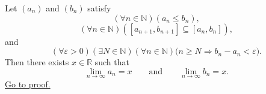 \begin{corollary}
\label{cor:nested-intervals-vanishing-length-have-equal-endpoint-limits}
Let $(a_n)$ and $(b_n)$ satisfy
\[
  (\forall n\in\mathbb{N})(a_n\leq b_n),
\]
\[
  (\forall n\in\mathbb{N})([a_{n+1},b_{n+1}]\subseteq [a_n,b_n]),
\]
and
\[
  (\forall\varepsilon>0)(\exists N\in\mathbb{N})(\forall n\in\mathbb{N})
  \bigl(n\geq N\Longrightarrow b_n-a_n<\varepsilon\bigr).
\]
Then there exists $x\in\mathbb{R}$ such that
\[
  \lim_{n\longrightarrow\infty}a_n=x
  \qquad\text{and}\qquad
  \lim_{n\longrightarrow\infty}b_n=x.
\]
\hyperref[prf:nested-intervals-vanishing-length-have-equal-endpoint-limits]{Go to proof.}
\end{corollary}